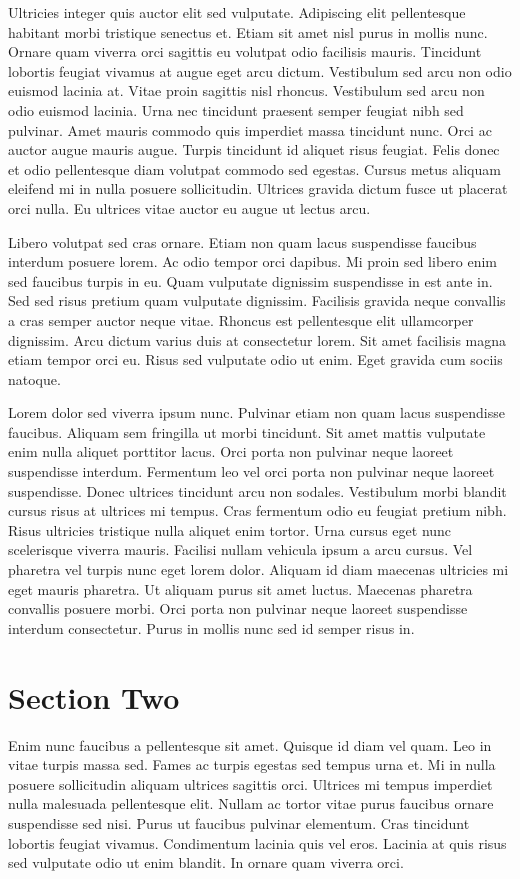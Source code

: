 \documentclass{ledger}
\begin{document}
Ultricies integer quis auctor elit sed vulputate. Adipiscing elit pellentesque habitant morbi tristique senectus et. Etiam sit amet nisl purus in mollis nunc. Ornare quam viverra orci sagittis eu volutpat odio facilisis mauris. Tincidunt lobortis feugiat vivamus at augue eget arcu dictum. Vestibulum sed arcu non odio euismod lacinia at. Vitae proin sagittis nisl rhoncus. Vestibulum sed arcu non odio euismod lacinia. Urna nec tincidunt praesent semper feugiat nibh sed pulvinar. Amet mauris commodo quis imperdiet massa tincidunt nunc. Orci ac auctor augue mauris augue. Turpis tincidunt id aliquet risus feugiat. Felis donec et odio pellentesque diam volutpat commodo sed egestas. Cursus metus aliquam eleifend mi in nulla posuere sollicitudin. Ultrices gravida dictum fusce ut placerat orci nulla. Eu ultrices vitae auctor eu augue ut lectus arcu.

Libero volutpat sed cras ornare. Etiam non quam lacus suspendisse faucibus interdum posuere lorem. Ac odio tempor orci dapibus. Mi proin sed libero enim sed faucibus turpis in eu. Quam vulputate dignissim suspendisse in est ante in. Sed sed risus pretium quam vulputate dignissim. Facilisis gravida neque convallis a cras semper auctor neque vitae. Rhoncus est pellentesque elit ullamcorper dignissim. Arcu dictum varius duis at consectetur lorem. Sit amet facilisis magna etiam tempor orci eu. Risus sed vulputate odio ut enim. Eget gravida cum sociis natoque.

Lorem dolor sed viverra ipsum nunc. Pulvinar etiam non quam lacus suspendisse faucibus. Aliquam sem fringilla ut morbi tincidunt. Sit amet mattis vulputate enim nulla aliquet porttitor lacus. Orci porta non pulvinar neque laoreet suspendisse interdum. Fermentum leo vel orci porta non pulvinar neque laoreet suspendisse. Donec ultrices tincidunt arcu non sodales. Vestibulum morbi blandit cursus risus at ultrices mi tempus. Cras fermentum odio eu feugiat pretium nibh. Risus ultricies tristique nulla aliquet enim tortor. Urna cursus eget nunc scelerisque viverra mauris. Facilisi nullam vehicula ipsum a arcu cursus. Vel pharetra vel turpis nunc eget lorem dolor. Aliquam id diam maecenas ultricies mi eget mauris pharetra. Ut aliquam purus sit amet luctus. Maecenas pharetra convallis posuere morbi.\cite{Doe} Orci porta non pulvinar neque laoreet suspendisse interdum consectetur. Purus in mollis nunc sed id semper risus in.


\section{Section Two}
Enim nunc faucibus a pellentesque sit amet. Quisque id diam vel quam. Leo in vitae turpis massa sed. Fames ac turpis egestas sed tempus urna et. Mi in nulla posuere sollicitudin aliquam ultrices sagittis orci. Ultrices mi tempus imperdiet nulla malesuada pellentesque elit. Nullam ac tortor vitae purus faucibus ornare suspendisse sed nisi. Purus ut faucibus pulvinar elementum. Cras tincidunt lobortis feugiat vivamus. Condimentum lacinia quis vel eros. Lacinia at quis risus sed vulputate odio ut enim blandit. In ornare quam viverra orci.\cite{Smith}
\end{document}
